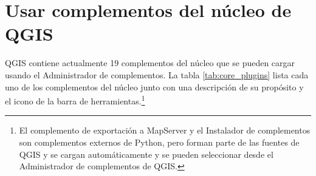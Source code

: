 
\section{Usar complementos del núcleo de QGIS}\label{sec:core_plugins}


QGIS contiene actualmente 19 complementos del núcleo que se pueden cargar usando el Administrador de complementos.
La tabla \ref{tab:core_plugins} lista cada uno de los complementos del núcleo junto con una
descripción de su propósito y el icono de la barra de herramientas.\footnote{El complemento
de exportación a MapServer y el Instalador de complementos son complementos externos de Python,
pero forman parte de las fuentes de QGIS y se cargan automáticamente y se pueden seleccionar 
desde el Administrador de complementos de QGIS.}

